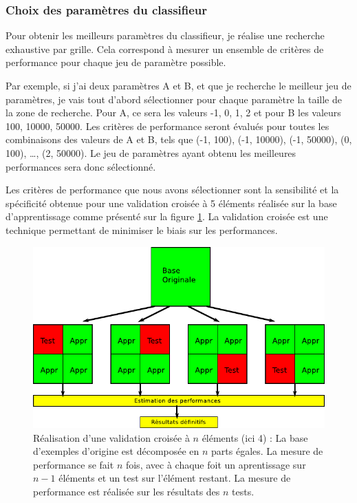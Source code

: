 \subsubsection{Choix des paramètres du classifieur}

Pour obtenir les meilleurs paramètres du classifieur, je réalise une recherche exhaustive par grille. Cela correspond à mesurer un ensemble de critères de performance pour chaque jeu de paramètre possible.

Par exemple, si j'ai deux paramètres A et B, et que je recherche le meilleur jeu de paramètres, je vais tout d'abord sélectionner pour chaque paramètre la taille de la zone de recherche. Pour A, ce sera les valeurs {-1, 0, 1, 2} et pour B les valeurs {100, 10000, 50000}. Les critères de performance seront évalués pour toutes les combinaisons des valeurs de A et B, tels que (-1, 100), (-1, 10000), (-1, 50000), (0, 100), \dots, (2, 50000). Le jeu de paramètres ayant obtenu les meilleures performances sera donc sélectionné. 

Les critères de performance que nous avons sélectionner sont la sensibilité et la spécificité obtenue pour une validation croisée à 5 éléments réalisée sur la base d'apprentissage comme présenté sur la figure \ref{fig:crossValid}. La validation croisée est une technique permettant de minimiser le biais sur les performances.

\begin{figure}[h!]
 \includegraphics[width=15cm]{images/crossValid}
 \caption{Réalisation d'une validation croisée à $n$ éléments (ici 4) : La base d'exemples d'origine est décomposée en $n$ parts égales. La mesure de performance se fait $n$ fois, avec à chaque foit un aprentissage sur $n-1$ éléments et un test sur l'élément restant. La mesure de performance est réalisée sur les résultats des $n$ tests.}
 \label{fig:crossValid}
\end{figure}


